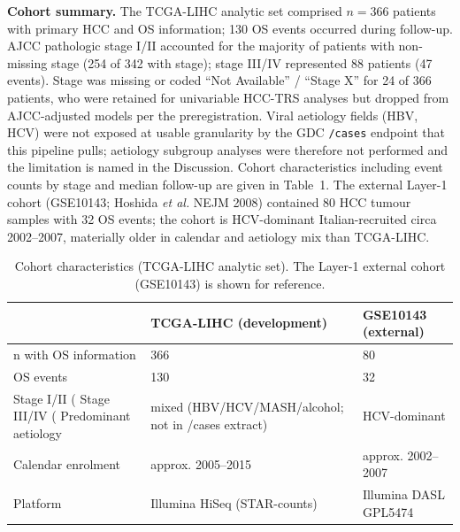 \documentclass[12pt]{article}
\newcommand{\HCCRTS}{HCC-TRS\xspace}
\begin{document}
\textbf{Cohort summary.} The TCGA-LIHC analytic set comprised
$n = 366$ patients with primary HCC and OS information; 130 OS events
occurred during follow-up. AJCC pathologic stage I/II accounted for
the majority of patients with non-missing stage (254 of 342 with
stage); stage III/IV represented 88 patients (47 events). Stage was
missing or coded ``Not Available'' / ``Stage X'' for 24 of 366
patients, who were retained for univariable \HCCRTS analyses but
dropped from AJCC-adjusted models per the preregistration. Viral
aetiology fields (HBV, HCV) were not exposed at usable granularity by
the GDC \texttt{/cases} endpoint that this pipeline pulls; aetiology
subgroup analyses were therefore not performed and the limitation is
named in the Discussion. Cohort characteristics including event
counts by stage and median follow-up are given in Table~1. The
external Layer-1 cohort (GSE10143; Hoshida \emph{et al.} NEJM 2008)
contained 80 HCC tumour samples with 32 OS events; the cohort is
HCV-dominant Italian-recruited circa 2002--2007, materially older in
calendar and aetiology mix than TCGA-LIHC.

\begin{table}[h!]
\centering
\caption{Cohort characteristics (TCGA-LIHC analytic set).
The Layer-1 external cohort (GSE10143) is shown for reference.}
\label{tab:cohort}
\begin{tabularx}{\linewidth}{l X X}
\toprule
& \textbf{TCGA-LIHC (development)} & \textbf{GSE10143 (external)} \\
\midrule
n with OS information           & 366                          & 80 \\
OS events                       & 130                          & 32 \\
Stage I/II (%
Stage III/IV (%
Predominant aetiology           & mixed (HBV/HCV/MASH/alcohol; not in /cases extract) & HCV-dominant \\
Calendar enrolment              & approx. 2005--2015           & approx. 2002--2007 \\
Platform                        & Illumina HiSeq (STAR-counts) & Illumina DASL GPL5474 \\
\bottomrule
\end{tabularx}
\end{table}
\end{document}
